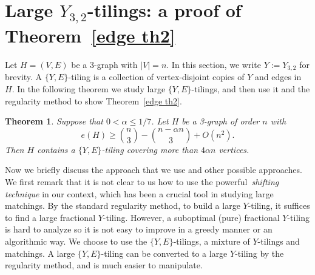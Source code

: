 \documentclass[11pt, reqno]{amsart}    	%
\newtheorem{thm}{Theorem}[section]
\theoremstyle{definition}
\numberwithin{equation}{section}
\begin{document}
	
	
	
	
	
	\section{Large $Y_{3,2}$-tilings: a proof of Theorem~\ref{edge th2}}
	\label{sec:6}
	
	
	Let $H=(V,E)$ be a $3$-graph with $|V|=n$. In this section, we write $ Y:=Y_{3,2} $ for brevity. 
	A $\{Y,E\}$-tiling is a collection of vertex-disjoint copies of $Y$ and edges in $H$. 
	In the following theorem we study large $\{Y,E\}$-tilings, and then use it and the regularity method to show Theorem~\ref{edge th2}. 
	
	\begin{thm}
		\label{edge th1}
		Suppose that $ 0<\alpha \le  1/7$. Let $H$ be a 3-graph of order $n$ with
		\[
		e(H)\ge\binom{n}{3}-\binom{n-\alpha n}{3}+O(n^2).
		\]
		Then $H$ contains a $\{Y,E\}$-tiling covering more than $ 4\alpha n$ vertices.
	\end{thm}
	
Now we briefly discuss the approach that we use and other possible approaches.
We first remark that it is not clear to us how to use the powerful~\emph{shifting technique} in our context, which has been a crucial tool in studying large matchings.
By the standard regularity method, to build a large $Y$-tiling, it suffices to find a large fractional $Y$-tiling.
However, a suboptimal (pure) fractional $Y$-tiling is hard to analyze so it is not easy to improve in a greedy manner or an algorithmic way.
We choose to use the $\{Y, E\}$-tilings, a mixture of $Y$-tilings and matchings.
A large $\{Y, E\}$-tiling can be converted to a large $Y$-tiling by the regularity method, and is much easier to manipulate.
\end{document}

